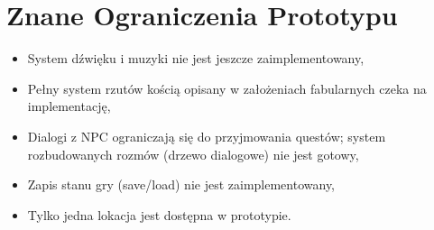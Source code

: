 \section{Znane Ograniczenia Prototypu}

\begin{itemize}
    \item System dźwięku i muzyki nie jest jeszcze zaimplementowany,
    \item Pełny system rzutów kością opisany w założeniach fabularnych czeka na implementację,
    \item Dialogi z NPC ograniczają się do przyjmowania questów; system rozbudowanych rozmów (drzewo dialogowe) nie jest gotowy,
    \item Zapis stanu gry (save/load) nie jest zaimplementowany,
    \item Tylko jedna lokacja jest dostępna w prototypie.
\end{itemize}
